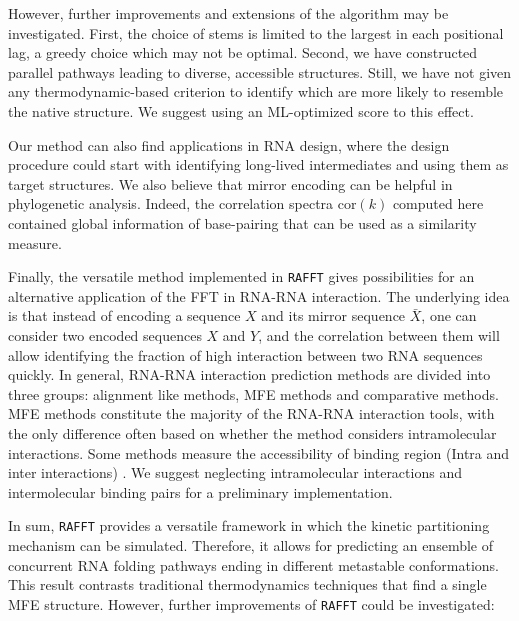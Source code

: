However, further improvements and extensions of the algorithm may be investigated. First, the choice of stems is limited to the largest in each positional lag, a greedy choice which may not be optimal. Second, we have constructed parallel pathways leading to diverse, accessible structures. Still, we have not given any thermodynamic-based criterion to identify which are more likely to resemble the native structure. We suggest using an \ac{ML}-optimized score to this effect. 

Our method can also find applications in \ac{RNA} design, where the design procedure could start with identifying long-lived intermediates and using them as target structures. We also believe that mirror encoding can be helpful in phylogenetic analysis. Indeed, the correlation spectra \(\text{cor}(k)\) computed here contained global information of base-pairing that can be used as a similarity measure. 


Finally, the versatile method implemented in \texttt{RAFFT} gives possibilities for an alternative application of the \ac{FFT} in \ac{RNA}-\ac{RNA} interaction. The underlying idea is that instead of encoding a sequence $X$ and its mirror sequence $\bar{X}$, one can consider two encoded sequences $X$ and $Y$, and the correlation between them will allow identifying the fraction of high interaction between two \ac{RNA} sequences quickly. In general, \ac{RNA}-\ac{RNA} interaction prediction methods are divided into three groups: alignment like methods, \ac{MFE} methods and comparative methods. \ac{MFE} methods constitute the majority of the \ac{RNA}-\ac{RNA} interaction tools, with the only difference often based on whether the method considers intramolecular interactions. Some methods measure the accessibility of binding region (Intra and inter interactions) \cite{umu2017comprehensive, dieterich2013computational, backofen2010computational}. We suggest neglecting intramolecular interactions and intermolecular binding pairs for a preliminary implementation. 

In sum, \texttt{RAFFT} provides a versatile framework in which the kinetic partitioning mechanism can be simulated. Therefore, it allows for predicting an ensemble of concurrent \ac{RNA} folding pathways ending in different metastable conformations. This result contrasts traditional thermodynamics techniques that find a single \ac{MFE} structure. However, further improvements of \texttt{RAFFT} could be investigated: 

